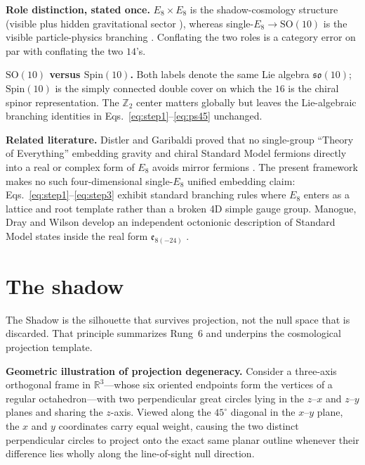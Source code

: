\documentclass[11pt]{article}
\begin{document}
\noindent\textbf{Role distinction, stated once.} $E_8 \times E_8$ is the shadow-cosmology structure (visible plus hidden gravitational sector \cite{candelas,predictions-paper}), whereas single-$E_8 \to \mathrm{SO}(10)$ is the visible particle-physics branching \cite{slansky,adler}. Conflating the two roles is a category error on par with conflating the two $14$'s.

\noindent\textbf{$\mathrm{SO}(10)$ versus $\mathrm{Spin}(10)$.} Both labels denote the same Lie algebra $\mathfrak{so}(10)$; $\mathrm{Spin}(10)$ is the simply connected double cover on which the $16$ is the chiral spinor representation. The $\mathbb{Z}_2$ center matters globally but leaves the Lie-algebraic branching identities in Eqs.~\eqref{eq:step1}--\eqref{eq:ps45} unchanged.

\noindent\textbf{Related literature.} Distler and Garibaldi proved that no single-group ``Theory of Everything'' embedding gravity and chiral Standard Model fermions directly into a real or complex form of $E_8$ avoids mirror fermions \cite{distler-garibaldi}. The present framework makes no such four-dimensional single-$E_8$ unified embedding claim: Eqs.~\eqref{eq:step1}--\eqref{eq:step3} exhibit standard branching rules \cite{slansky,adler,joglekar-rosner} where $E_8$ enters as a lattice and root template rather than a broken 4D simple gauge group. Manogue, Dray and Wilson develop an independent octonionic description of Standard Model states inside the real form $\mathfrak{e}_{8(-24)}$ \cite{manogue-dray-wilson}.

\section{The shadow}
\label{sec:shadow}
The Shadow is the silhouette that survives projection, not the null space that is discarded. That principle summarizes Rung~6 and underpins the cosmological projection template.

\noindent\textbf{Geometric illustration of projection degeneracy.} Consider a three-axis orthogonal frame in $\mathbb{R}^3$---whose six oriented endpoints form the vertices of a regular octahedron---with two perpendicular great circles lying in the $z$--$x$ and $z$--$y$ planes and sharing the $z$-axis. Viewed along the $45^\circ$ diagonal in the $x$--$y$ plane, the $x$ and $y$ coordinates carry equal weight, causing the two distinct perpendicular circles to project onto the exact same planar outline whenever their difference lies wholly along the line-of-sight null direction.
\end{document}
